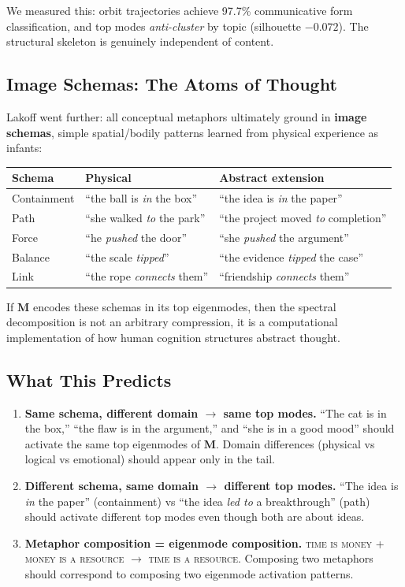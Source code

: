 \documentclass[11pt, a4paper]{article}
\newcommand{\M}{\mathbf{M}}
\theoremstyle{remark}
\begin{document}
We measured this: orbit trajectories achieve 97.7\% communicative form classification, and top modes \emph{anti-cluster} by topic (silhouette $-0.072$).
The structural skeleton is genuinely independent of content.

\subsection{Image Schemas: The Atoms of Thought}

Lakoff went further: all conceptual metaphors ultimately ground in \textbf{image schemas}, simple spatial/bodily patterns learned from physical experience as infants:

\begin{center}\small
\begin{tabular}{@{}lll@{}}
\toprule
Schema & Physical & Abstract extension \\
\midrule
Containment & ``the ball is \emph{in} the box'' & ``the idea is \emph{in} the paper'' \\
Path & ``she walked \emph{to} the park'' & ``the project moved \emph{to} completion'' \\
Force & ``he \emph{pushed} the door'' & ``she \emph{pushed} the argument'' \\
Balance & ``the scale \emph{tipped}'' & ``the evidence \emph{tipped} the case'' \\
Link & ``the rope \emph{connects} them'' & ``friendship \emph{connects} them'' \\
\bottomrule
\end{tabular}
\end{center}

If $\M$ encodes these schemas in its top eigenmodes, then the spectral decomposition is not an arbitrary compression, it is a computational implementation of how human cognition structures abstract thought.

\subsection{What This Predicts}

\begin{enumerate}[nosep]
    \item \textbf{Same schema, different domain $\to$ same top modes.}
    ``The cat is in the box,'' ``the flaw is in the argument,'' and ``she is in a good mood'' should activate the same top eigenmodes of $\M$.
    Domain differences (physical vs logical vs emotional) should appear only in the tail.

    \item \textbf{Different schema, same domain $\to$ different top modes.}
    ``The idea is \emph{in} the paper'' (containment) vs ``the idea \emph{led to} a breakthrough'' (path) should activate different top modes even though both are about ideas.

    \item \textbf{Metaphor composition = eigenmode composition.}
    \textsc{time is money} + \textsc{money is a resource} $\to$ \textsc{time is a resource}.
    Composing two metaphors should correspond to composing two eigenmode activation patterns.
\end{enumerate}
\end{document}
